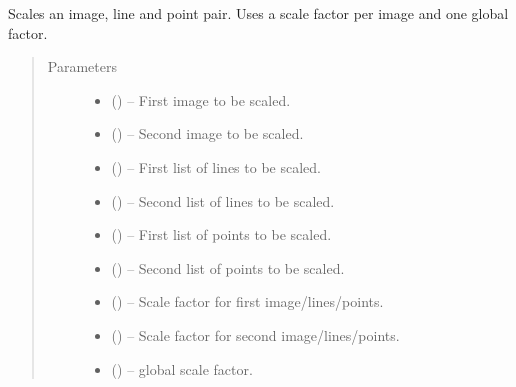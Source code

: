 \documentclass[letterpaper,10pt,english]{sphinxmanual}
\begin{document}
\begin{fulllineitems}
\label{\detokenize{image_helpers:image_helpers.do_scale}}
Scales an image, line and point pair.
Uses a scale factor per image and one global factor.
\begin{quote}\begin{description}
\item[{Parameters}] \leavevmode\begin{itemize}
\item {} 
 () -- First image to be scaled.

\item {} 
 () -- Second image to be scaled.

\item {} 
 () -- First list of lines to be scaled.

\item {} 
 () -- Second list of lines to be scaled.

\item {} 
 () -- First list of points to be scaled.

\item {} 
 () -- Second list of points to be scaled.

\item {} 
 () -- Scale factor for first image/lines/points.

\item {} 
 () -- Scale factor for second image/lines/points.

\item {} 
 () -- global scale factor.

\end{itemize}


\end{description}
\end{quote}
\end{fulllineitems}
\end{document}
